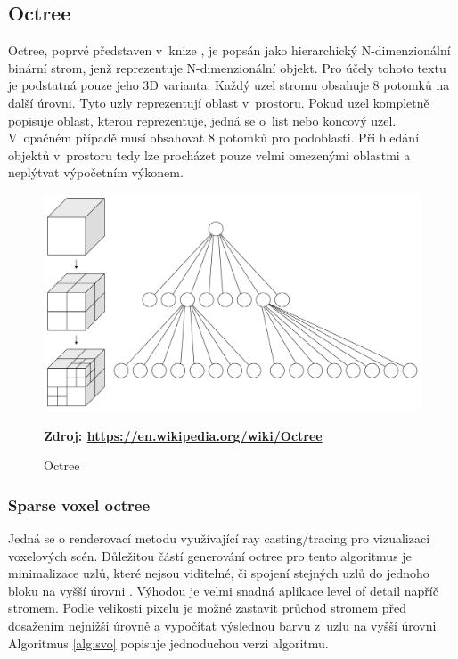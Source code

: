 \subsection{Octree} \label{octree}
Octree, poprvé představen v~knize \cite{rensselaer1980octree}, je popsán jako hierarchický N-dimenzionální binární strom, jenž reprezentuje N-dimenzionální objekt. Pro účely tohoto textu je podstatná pouze jeho 3D varianta. Každý uzel stromu obsahuje 8 potomků na další úrovni. Tyto uzly reprezentují oblast v~prostoru. Pokud uzel kompletně popisuje oblast, kterou reprezentuje, jedná se o~list nebo koncový uzel. V~opačném případě musí obsahovat 8 potomků pro podoblasti. Při hledání objektů v~prostoru tedy lze procházet pouze velmi omezenými oblastmi a neplýtvat výpočetním výkonem.

\begin{figure}[H]
	\centering
	\includegraphics[scale=0.1]{obrazky-figures/Octree2.pdf}
	\caption{Octree}
	\textbf{Zdroj: \url{https://en.wikipedia.org/wiki/Octree}}
	\label{fig:slabs}
\end{figure}


\subsubsection{Sparse voxel octree}\label{svo_alg}
Jedná se o renderovací metodu využívající ray casting/tracing pro vizualizaci voxelových scén. Důležitou částí generování octree pro tento algoritmus je minimalizace uzlů, které nejsou viditelné, či spojení stejných uzlů do jednoho bloku na vyšší úrovni \cite{Laine2011EfficientSV}. Výhodou je velmi snadná aplikace level of detail napříč stromem. Podle velikosti pixelu je možné zastavit průchod stromem před dosažením nejnižší úrovně a vypočítat výslednou barvu z~uzlu na vyšší úrovni. Algoritmus \ref{alg:svo} popisuje jednoduchou verzi algoritmu.

